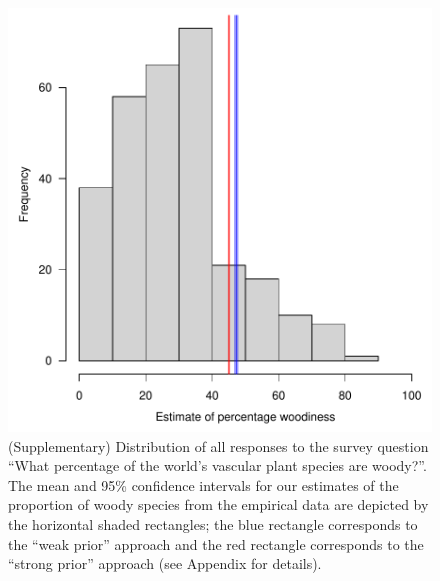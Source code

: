 \documentclass[12pt]{article}
\begin{document}
\begin{figure}[p]
  \centering
  \includegraphics{figs/survey-distribution}
  \caption{(Supplementary) Distribution of all responses to the survey
    question ``What percentage of the world's vascular plant species
    are woody?''.
    The mean and 95\% confidence intervals for our estimates of the
    proportion of woody species from the empirical data are depicted
    by the horizontal shaded rectangles; the blue rectangle corresponds
    to the ``weak prior'' approach and the red rectangle corresponds
    to the ``strong prior'' approach (see Appendix for details).  }

  \label{fig:survey-distribution}
\end{figure}
\end{document}
